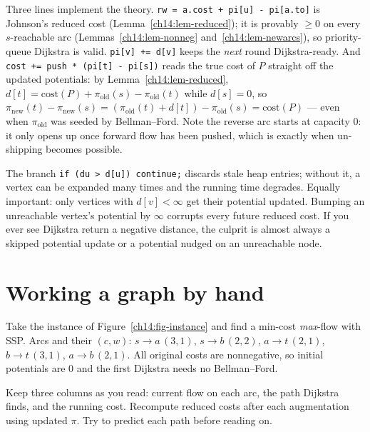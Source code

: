 \begin{whybox}
Three lines implement the theory. \texttt{rw = a.cost + pi[u] - pi[a.to]} is Johnson's reduced cost (Lemma~\ref{ch14:lem-reduced}); it is provably $\ge 0$ on every $s$-reachable arc (Lemmas~\ref{ch14:lem-nonneg} and~\ref{ch14:lem-newarcs}), so priority-queue Dijkstra is valid. \texttt{pi[v] += d[v]} keeps the \emph{next} round Dijkstra-ready. And \texttt{cost += push * (pi[t] - pi[s])} reads the true cost of $P$ straight off the updated potentials: by Lemma~\ref{ch14:lem-reduced}, $d[t]=\mathrm{cost}(P)+\pi_{\mathrm{old}}(s)-\pi_{\mathrm{old}}(t)$ while $d[s]=0$, so $\pi_{\mathrm{new}}(t)-\pi_{\mathrm{new}}(s)=(\pi_{\mathrm{old}}(t)+d[t])-\pi_{\mathrm{old}}(s)=\mathrm{cost}(P)$ --- even when $\pi_{\mathrm{old}}$ was seeded by Bellman--Ford. Note the reverse arc starts at capacity $0$: it only opens up once forward flow has been pushed, which is exactly when un-shipping becomes possible.
\end{whybox}

\begin{trapbox}
The branch \texttt{if (du > d[u]) continue;} discards stale heap entries; without it, a vertex can be expanded many times and the running time degrades. Equally important: only vertices with $d[v]<\infty$ get their potential updated. Bumping an unreachable vertex's potential by $\infty$ corrupts every future reduced cost. If you ever see Dijkstra return a negative distance, the culprit is almost always a skipped potential update or a potential nudged on an unreachable node.
\end{trapbox}

\section{Working a graph by hand}
\label{ch14:trace}

Take the instance of Figure~\ref{ch14:fig-instance} and find a min-cost \emph{max}-flow with SSP. Arcs and their $(c,w)$: $s\!\to\!a\,(3,1)$, $s\!\to\!b\,(2,2)$, $a\!\to\!t\,(2,1)$, $b\!\to\!t\,(3,1)$, $a\!\to\!b\,(2,1)$. All original costs are nonnegative, so initial potentials are $0$ and the first Dijkstra needs no Bellman--Ford.

\begin{labbox}
Keep three columns as you read: current flow on each arc, the path Dijkstra finds, and the running cost. Recompute reduced costs after each augmentation using updated $\pi$. Try to predict each path before reading on.
\end{labbox}

